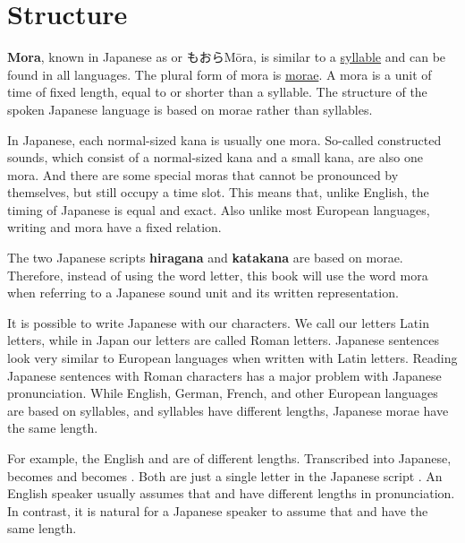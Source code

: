 

\section{Structure}


\textbf{Mora}, known in Japanese as  or
もおら{Mōra}, is similar to a
\hyperref[sec:Syllable]{syllable} and can be found in all languages. The plural
form of mora is \hyperref[sec:Mora]{morae}. A mora is a unit of time of fixed
length, equal to or shorter than a syllable. The structure of the spoken
Japanese language is based on morae rather than syllables.

In Japanese, each normal-sized kana is usually one mora. So-called constructed
sounds, which consist of a normal-sized kana and a small kana, are also one
mora. And there are some special moras that cannot be pronounced by themselves,
but still occupy a time slot. This means that, unlike English, the timing of
Japanese is equal and exact. Also unlike most European languages, writing and
mora have a fixed relation.

The two Japanese scripts \textbf{hiragana} and \textbf{katakana} are based on
morae. Therefore, instead of using the word letter, this book will use the
word mora when referring to a Japanese sound unit and its written
representation.

It is possible to write Japanese with our characters. We call our letters Latin
letters, while in Japan our letters are called Roman letters. Japanese
sentences look very similar to European languages when written with Latin
letters. Reading Japanese sentences with Roman characters has a major problem
with Japanese pronunciation. While English, German, French, and other European
languages are based on syllables, and syllables have different lengths,
Japanese morae have the same length.

For example, the English  and  are of different lengths.
Transcribed into Japanese,  becomes \jquotesingleja{\jkanaletteri} and
 becomes \jquotesingleja{\jkanalettershi}. Both are just a single
letter in the Japanese script \jtopic. An English speaker usually assumes that
 and  have different lengths in pronunciation. In contrast, it
is natural for a Japanese speaker to assume that \jquotesingleja{\jkanaletteri}
and \jquotesingleja{\jkanalettershi} have the same length.

